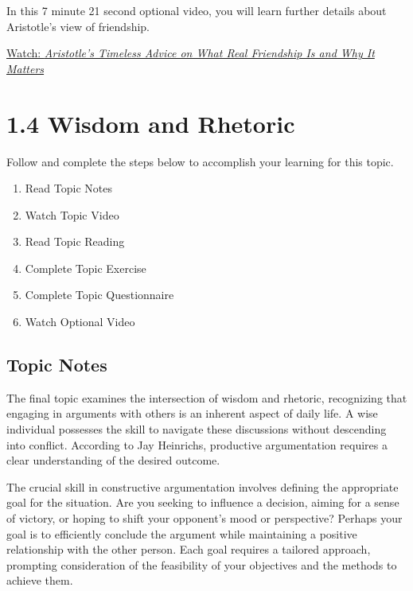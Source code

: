 \documentclass[
]{book}
\providecommand{\tightlist}{%
  \setlength{\itemsep}{0pt}\setlength{\parskip}{0pt}}
\begin{document}
\begin{reflect}
In this 7 minute 21 second optional video, you will learn further details about Aristotle's view of friendship.

\href{https://www.youtube.com/watch?v=F18kSA8OxqY}{Watch: \emph{Aristotle's Timeless Advice on What Real Friendship Is and Why It Matters}}
\end{reflect}

\hypertarget{wisdom-and-rhetoric}{%
\section*{1.4 Wisdom and Rhetoric}\label{wisdom-and-rhetoric}}

Follow and complete the steps below to accomplish your learning for this topic.

\begin{enumerate}
\def\labelenumi{\arabic{enumi}.}
\tightlist
\item
  Read Topic Notes
\item
  Watch Topic Video
\item
  Read Topic Reading
\item
  Complete Topic Exercise
\item
  Complete Topic Questionnaire
\item
  Watch Optional Video
\end{enumerate}

\hypertarget{topic-notes-3}{%
\subsection*{Topic Notes}\label{topic-notes-3}}

The final topic examines the intersection of wisdom and rhetoric, recognizing that engaging in arguments with others is an inherent aspect of daily life. A wise individual possesses the skill to navigate these discussions without descending into conflict. According to Jay Heinrichs, productive argumentation requires a clear understanding of the desired outcome.

The crucial skill in constructive argumentation involves defining the appropriate goal for the situation. Are you seeking to influence a decision, aiming for a sense of victory, or hoping to shift your opponent's mood or perspective? Perhaps your goal is to efficiently conclude the argument while maintaining a positive relationship with the other person. Each goal requires a tailored approach, prompting consideration of the feasibility of your objectives and the methods to achieve them.
\end{document}
